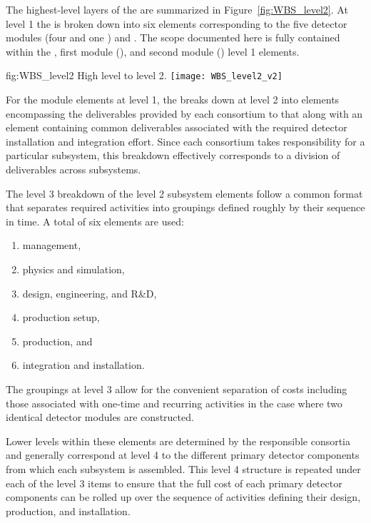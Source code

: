 The highest-level layers of the   are summarized 
in Figure~\ref{fig:WBS_level2}.  At level 1 the  is broken down into 
six elements corresponding to the five  detector modules (four 
 and one ) and .  The scope documented
here is fully contained within the , first  module 
(), and second  module () level 1 elements.   
\begin{dunefigure}{fig:WBS_level2}
  {High level   to level 2.}
  \texttt{[image: WBS\_level2\_v2]}
\end{dunefigure}

For the  module elements at level 1, the  breaks 
down at level 2 into elements encompassing the deliverables provided by 
each consortium to that  along with an element containing 
common deliverables associated with the required detector installation 
and integration effort.  Since each consortium takes responsibility 
for a particular subsystem, this breakdown effectively corresponds to 
a division of deliverables across subsystems. 

The level 3 breakdown of the level 2 subsystem  elements follow 
a common format that separates required activities into groupings defined 
roughly by their sequence in time.  A total of six elements are used:     
\begin{enumerate}
  \item management,
  \item physics and simulation,
  \item design, engineering, and R\&D,
  \item production setup,
  \item production, and
  \item integration and installation.
\end{enumerate}
The groupings at level 3 allow for the convenient separation of costs
 including those associated with one-time and recurring activities in the
 case where two identical detector modules are constructed.

Lower levels within these  elements are determined by 
the responsible consortia and generally correspond at level 4 to 
the different primary detector components from which each subsystem
is assembled.  This level 4 structure is repeated under each of the 
level 3 items to ensure that the full cost of each primary detector 
components can be rolled up over the sequence of activities defining 
their design, production, and installation.       

